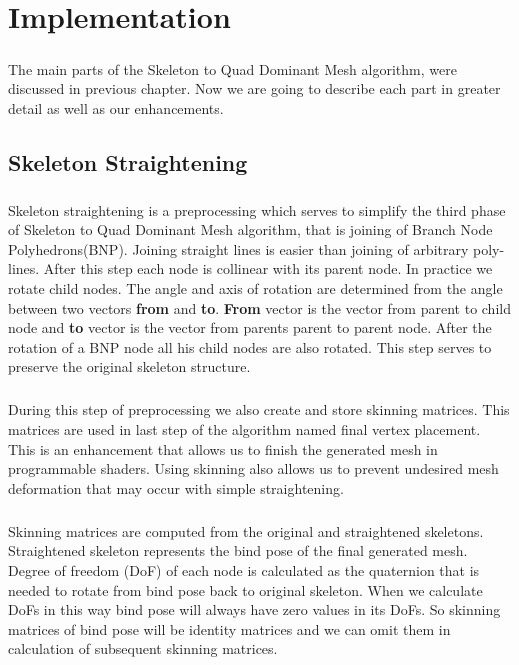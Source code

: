 \chapter{Implementation}


\paragraph{}
The main parts of the Skeleton to Quad Dominant Mesh algorithm, were discussed in previous chapter. Now we are going to describe each part in greater detail as well as our enhancements.

\section{Skeleton Straightening}
\label{sec:skeleton_straightening} 

\paragraph{}
Skeleton straightening is a preprocessing which serves to simplify the third phase of Skeleton to Quad Dominant Mesh algorithm, that is joining of Branch Node Polyhedrons(BNP). Joining straight lines is easier than joining of arbitrary poly-lines. After this step each node is collinear with its parent node. In practice we rotate child nodes. The angle and axis of rotation are determined from the angle between two vectors \textbf{from} and \textbf{to}. \textbf{From} vector is the vector from parent to child node and \textbf{to} vector is the vector from parents parent to parent node. After the rotation of a BNP node all his child nodes are also rotated. This step serves to preserve the original skeleton structure.
\paragraph{}
During this step of preprocessing we also create and store skinning matrices. This matrices are used in last step of the algorithm named final vertex placement. This is an enhancement that allows us to finish the generated mesh in programmable shaders. Using skinning also allows us to prevent undesired mesh deformation that may occur with simple straightening.
\paragraph{}
Skinning matrices are computed from the original and straightened skeletons. Straightened skeleton represents the bind pose of the final generated mesh. Degree of freedom (DoF) of each node is calculated as the quaternion that is needed to rotate from bind pose back to original skeleton. When we calculate DoFs in this way bind pose will always have zero values in its DoFs. So skinning matrices of bind pose will be identity matrices and we can omit them in calculation of subsequent skinning matrices.

